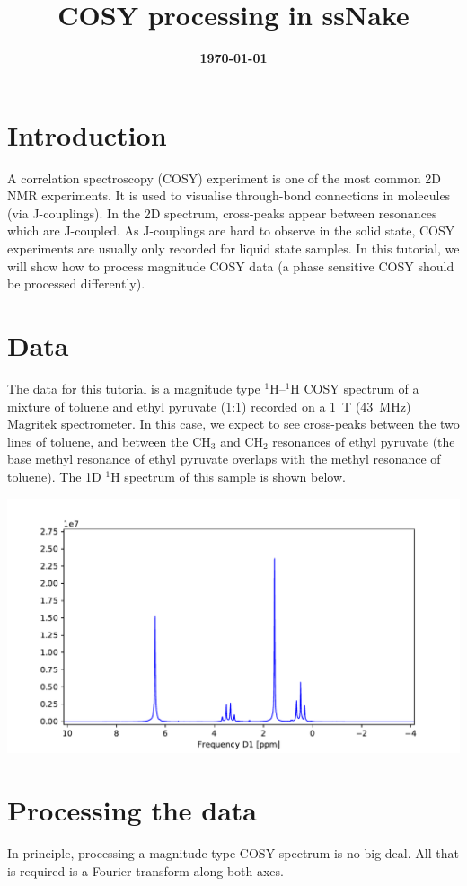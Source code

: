 \documentclass[11pt,a4paper]{article}
\title{\color{black}\fontfamily{SourceSansPro-LF}\bfseries COSY processing in ssNake}
\author{}
\date{\color{black}\fontfamily{SourceSansPro-LF}\bfseries \today}
\begin{document}

\maketitle

\section{Introduction}
A correlation spectroscopy (COSY) experiment is one of the most common 2D NMR experiments.
It is used to visualise through-bond connections in molecules (via J-couplings).
In the 2D spectrum, cross-peaks appear between resonances which are J-coupled.
As J-couplings are hard to observe in the solid state, COSY experiments are usually only recorded for liquid state samples.
In this tutorial, we will show how to process magnitude COSY data (a phase sensitive COSY should be processed differently).


\section{Data}
The data for this tutorial is a magnitude type $^1$H--$^1$H COSY spectrum of a mixture of toluene and ethyl pyruvate (1:1) recorded on a \SI{1}{\tesla} (\SI{43}{\MHz}) Magritek spectrometer.
In this case, we expect to see cross-peaks between the two lines of toluene, and between the CH$_3$ and CH$_2$ resonances of ethyl pyruvate (the base methyl resonance of ethyl pyruvate overlaps with the methyl resonance of toluene).
The 1D $^1$H spectrum of this sample is shown below.
\begin{center}
\includegraphics[width=0.8\linewidth]{Figs/1D.pdf}
\end{center}

\section{Processing the data}
In principle, processing a magnitude type COSY spectrum is no big deal.
All that is required is a Fourier transform along both axes.
\end{document}
